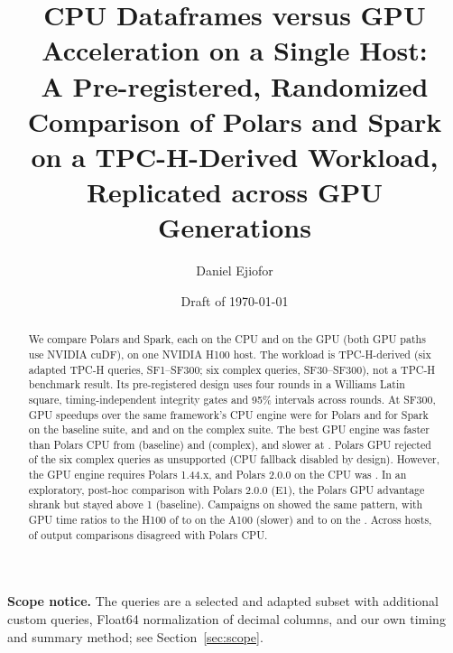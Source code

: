 \documentclass[11pt]{article}
\title{CPU Dataframes versus GPU Acceleration on a Single Host:\\
  A Pre-registered, Randomized Comparison of Polars and Spark\\
  on a TPC-H-Derived Workload\ifladderran, Replicated across GPU Generations\fi}
\author{Daniel Ejiofor}
\affil{Boston University, Boston, MA, USA}
\affil{\href{mailto:ejiod@bu.edu}{\nolinkurl{ejiod@bu.edu}}}
\date{Draft of \today\watermarknotice}
\begin{document}
\maketitle

\begin{abstract}
We compare Polars and Spark, each on the CPU and on the GPU (both GPU paths
use NVIDIA cuDF), on one NVIDIA H100 host. The workload
is TPC-H-derived (six adapted TPC-H queries, SF1--SF300; six complex queries,
SF30--SF300), not a TPC-H benchmark result. Its pre-registered design uses
four rounds in a Williams Latin square, timing-independent integrity gates and
95\% intervals across rounds. At SF300, GPU speedups over the same
framework's CPU engine were  for Polars and
 for Spark on the baseline suite, and
 and  on the complex
suite. The best GPU engine was faster than Polars CPU from
 (baseline) and
 (complex), and slower at
. Polars GPU rejected
 of the six complex queries as
unsupported (CPU fallback disabled by design). However, the GPU engine
requires Polars 1.44.x, and Polars 2.0.0 on the CPU was
. In an exploratory, post-hoc comparison with
Polars 2.0.0 (E1), the Polars GPU advantage shrank but stayed above 1
 (baseline).
\ifladderran
Campaigns on  showed the same pattern, with GPU
time ratios to the H100 of
\ifaonehundredran
{} to  on the
A100 (slower) and
\fi
 to  on the
.
\fi
Across  hosts,  of
 output comparisons disagreed with Polars CPU.
\end{abstract}

\noindent\textbf{Scope notice.} \tpcdisclaimer{} The queries are a selected
and adapted subset with additional custom queries, Float64 normalization of
decimal columns, and our own timing and summary method; see
Section~\ref{sec:scope}.
\end{document}
